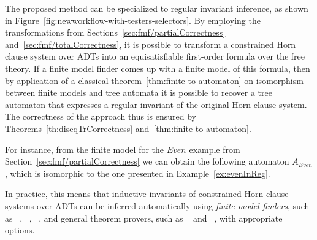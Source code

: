 The proposed method can be specialized to regular invariant inference, as shown in Figure~\cref{fig:newworkflow-with-testers-selectors}. By employing the transformations from Sections~\cref{sec:fmf/partialCorrectness} and~\cref{sec:fmf/totalCorrectness}, it is possible to transform a constrained Horn clause system over ADTs into an equisatisfiable first-order formula over the free theory. If a finite model finder comes up with a finite model of this formula, then by application of a classical theorem~\ref{thm:finite-to-automaton} on isomorphism between finite models and tree automata it is possible to recover a tree automaton that expresses a regular invariant of the original Horn clause system. The correctness of the approach thus is ensured by Theorems~\ref{th:diseqTrCorrectness} and~\ref{thm:finite-to-automaton}.

For instance, from the finite model for the $Even$ example from Section~\cref{sec:fmf/partialCorrectness} we can obtain the following automaton $A_{Even}$, which is isomorphic to the one presented in Example~\ref{ex:evenInReg}.
 \exampleCostruction

In practice, this means that inductive invariants of constrained Horn clause systems over ADTs can be inferred automatically using \emph{finite model finders}, such as \mace{}~\cite{https://doi.org/10.48550/arxiv.cs/0310055}, \kodkod{}~\cite{10.1007/978-3-540-71209-1_49}, \paradox{}~\cite{claessen2003new}, and general theorem provers, such as \cvc{}~\cite{reynolds2013finite} and \vampire{}~\cite{10.1007/978-3-319-40970-2_20}, with appropriate options.

